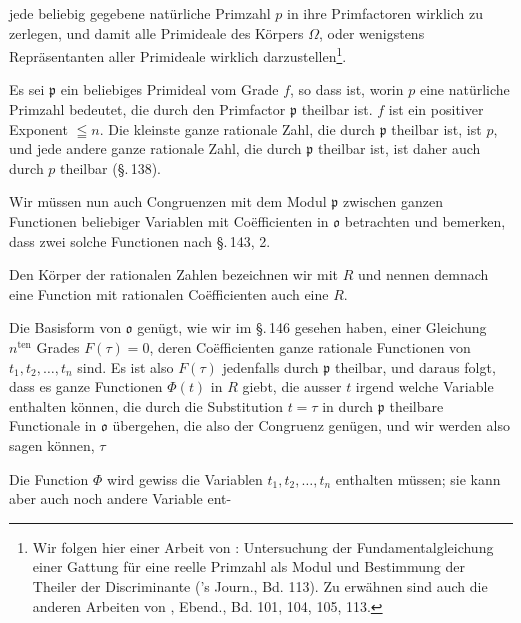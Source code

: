 jede beliebig gegebene natürliche Primzahl $p$ in ihre Primfactoren
wirklich zu zerlegen, und damit alle Primideale des Körpers $\Omega$,
oder wenigstens Repräsentanten aller Primideale wirklich
darzustellen\footnote{Wir folgen hier einer Arbeit von : \glqq Untersuchung der
Fundamentalgleichung einer Gattung für eine reelle Primzahl als Modul
und Bestimmung der Theiler der Discriminante\grqq{} ('s Journ., Bd. 113).
Zu erwähnen sind auch die anderen Arbeiten von , Ebend.,
Bd. 101, 104, 105, 113.}.

Es sei $\mathfrak p$ ein beliebiges Primideal vom Grade $f$, so dass
ist, worin $p$ eine natürliche Primzahl bedeutet, die durch den
Primfactor $\mathfrak p$ theilbar ist. $f$ ist ein positiver Exponent
$\leqq n$. Die kleinste ganze rationale Zahl, die durch $\mathfrak p$
theilbar ist, ist $p$, und jede andere ganze rationale Zahl, die durch
$\mathfrak p$ theilbar ist, ist daher auch durch $p$ theilbar
(\S.\,138).

Wir müssen nun auch Congruenzen mit dem Modul $\mathfrak p$ zwischen
ganzen Functionen beliebiger Variablen mit Coëfficienten in
$\mathfrak o$ betrachten und bemerken, dass zwei solche Functionen
nach \S.\,143, 2. 

Den Körper der rationalen Zahlen bezeichnen wir mit $R$ und nennen
demnach eine Function mit rationalen Coëfficienten auch eine  $R$.

Die Basisform von $\mathfrak o$
genügt, wie wir im \S.\,146 gesehen haben, einer Gleichung
$n^{\text{ten}}$ Grades $F(\tau) = 0$, deren Coëfficienten ganze
rationale Functionen von $t_1, t_2, \ldots, t_n$ sind. Es ist also
$F(\tau)$ jedenfalls durch $\mathfrak p$ theilbar, und daraus folgt,
dass es ganze Functionen $\Phi(t)$ in $R$ giebt, die ausser $t$
irgend welche Variable enthalten können, die durch die Substitution
$t = \tau$ in durch $\mathfrak p$ theilbare Functionale in
$\mathfrak o$ übergehen, die also der Congruenz
genügen, und wir werden also sagen können, $\tau$ 

Die Function $\Phi$ wird gewiss die Variablen $t_1, t_2, \ldots, t_n$
enthalten müssen; sie kann aber auch noch andere Variable ent-
